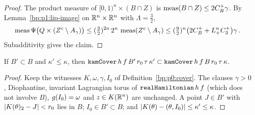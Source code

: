 \begin{proof}
\label{step:p4:mm-count}
The product measure of $[0,1)^n\times(B\cap Z)$ is $\operatorname{meas}(B\cap Z)\le2C_B^+\gamma$. By
Lemma~\ref{bp:p1:lip-image} on $\mathbb{R}^n\times\mathbb{R}^n$ with $\Lambda=\frac32$,
\begin{equation*}
\operatorname{meas}\Psi\bigl(Q\times(Z^c\setminus A_\gamma)\bigr)\le(\tfrac32)^{2n}\,2^n\,\operatorname{meas}(Z^c\setminus A_\gamma)\le(\tfrac92)^n\bigl(2C_B^++L_{+}^nC_3^+\bigr)\gamma\,.
\end{equation*}
Subadditivity gives the claim.
\end{proof}

\begin{lemma}\label{bp:p4:cover-mono}
If $B'\subset B$ and $\kappa'\le\kappa$, then
$\texttt{kamCover}\,h\,f\,B'\,r_0\,\tau\,\kappa'\subset\texttt{kamCover}\,h\,f\,B\,r_0\,\tau\,\kappa$.
\end{lemma}

\begin{proof}
\label{step:p4:cm-proof}
Keep the witnesses $K,\omega,\gamma,I_0$ of Definition~\ref{bp:p0:cover}. The clauses $\gamma>0$,
Diophantine, invariant Lagrangian torus of $\texttt{realHamiltonian}\,h\,f$ (which does not involve
$B$), $g(I_0)=\omega$ and $z\in K(\mathbb{R}^n)$ are unchanged. A point $J\in B'$ with
$\lvert K(\theta)_2-J\rvert<r_0$ lies in $B$; $I_0\in B'\subset B$; and
$\lvert K(\theta)-(\theta,I_0)\rvert\le\kappa'\le\kappa$.
\end{proof}

